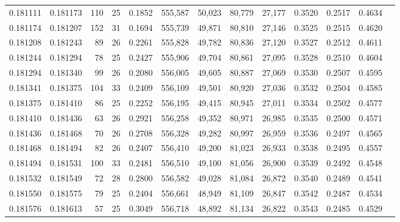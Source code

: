 \begin{tabular}{rrrrrrrrrrrrr}
0.181111 & 0.181173 & 110 &  25 &                                     0.1852 & 555,587 &  50,023 &  80,779 &  27,177 & 0.3520 & 0.2517 & 0.4634 \\
0.181174 & 0.181207 & 152 &  31 &                                     0.1694 & 555,739 &  49,871 &  80,810 &  27,146 & 0.3525 & 0.2515 & 0.4620 \\
0.181208 & 0.181243 &  89 &  26 &                                     0.2261 & 555,828 &  49,782 &  80,836 &  27,120 & 0.3527 & 0.2512 & 0.4611 \\
0.181244 & 0.181294 &  78 &  25 &                                     0.2427 & 555,906 &  49,704 &  80,861 &  27,095 & 0.3528 & 0.2510 & 0.4604 \\
0.181294 & 0.181340 &  99 &  26 &                                     0.2080 & 556,005 &  49,605 &  80,887 &  27,069 & 0.3530 & 0.2507 & 0.4595 \\
0.181341 & 0.181375 & 104 &  33 &                                     0.2409 & 556,109 &  49,501 &  80,920 &  27,036 & 0.3532 & 0.2504 & 0.4585 \\
0.181375 & 0.181410 &  86 &  25 &                                     0.2252 & 556,195 &  49,415 &  80,945 &  27,011 & 0.3534 & 0.2502 & 0.4577 \\
0.181410 & 0.181436 &  63 &  26 &                                     0.2921 & 556,258 &  49,352 &  80,971 &  26,985 & 0.3535 & 0.2500 & 0.4571 \\
0.181436 & 0.181468 &  70 &  26 &                                     0.2708 & 556,328 &  49,282 &  80,997 &  26,959 & 0.3536 & 0.2497 & 0.4565 \\
0.181468 & 0.181494 &  82 &  26 &                                     0.2407 & 556,410 &  49,200 &  81,023 &  26,933 & 0.3538 & 0.2495 & 0.4557 \\
0.181494 & 0.181531 & 100 &  33 &                                     0.2481 & 556,510 &  49,100 &  81,056 &  26,900 & 0.3539 & 0.2492 & 0.4548 \\
0.181532 & 0.181549 &  72 &  28 &                                     0.2800 & 556,582 &  49,028 &  81,084 &  26,872 & 0.3540 & 0.2489 & 0.4541 \\
0.181550 & 0.181575 &  79 &  25 &                                     0.2404 & 556,661 &  48,949 &  81,109 &  26,847 & 0.3542 & 0.2487 & 0.4534 \\
0.181576 & 0.181613 &  57 &  25 &                                     0.3049 & 556,718 &  48,892 &  81,134 &  26,822 & 0.3543 & 0.2485 & 0.4529 \\

\end{tabular}
